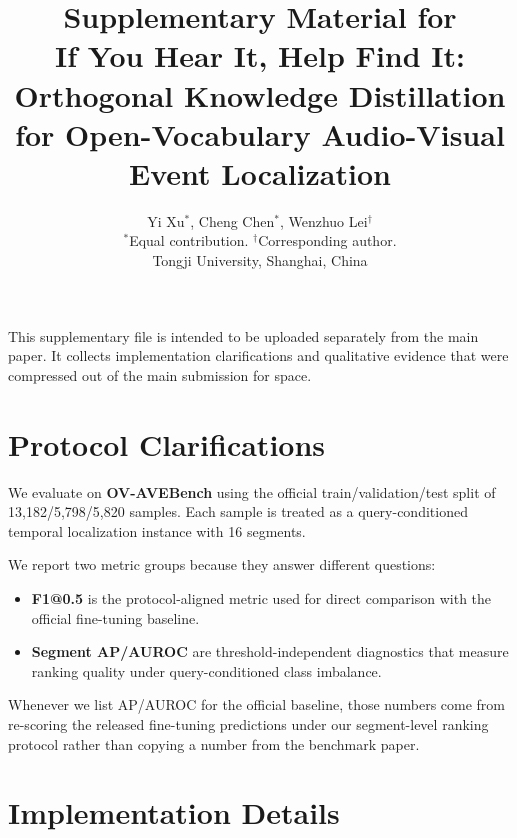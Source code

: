 \documentclass[11pt]{article}
\title{Supplementary Material for\\
If You Hear It, Help Find It: Orthogonal Knowledge Distillation for Open-Vocabulary Audio-Visual Event Localization}
\author{Yi Xu$^*$, Cheng Chen$^*$, Wenzhuo Lei$^\dagger$\\
\small $^*$Equal contribution. $^\dagger$Corresponding author.\\
\small Tongji University, Shanghai, China}
\date{}
\begin{document}
\maketitle

This supplementary file is intended to be uploaded separately from the main paper. It collects implementation clarifications and qualitative evidence that were compressed out of the main submission for space.

\section{Protocol Clarifications}

We evaluate on \textbf{OV-AVEBench} using the official train/validation/test split of 13{,}182/5{,}798/5{,}820 samples. Each sample is treated as a query-conditioned temporal localization instance with 16 segments.

We report two metric groups because they answer different questions:
\begin{itemize}
    \item \textbf{F1@0.5} is the protocol-aligned metric used for direct comparison with the official fine-tuning baseline.
    \item \textbf{Segment AP/AUROC} are threshold-independent diagnostics that measure ranking quality under query-conditioned class imbalance.
\end{itemize}

Whenever we list AP/AUROC for the official baseline, those numbers come from re-scoring the released fine-tuning predictions under our segment-level ranking protocol rather than copying a number from the benchmark paper.

\section{Implementation Details}
\end{document}
